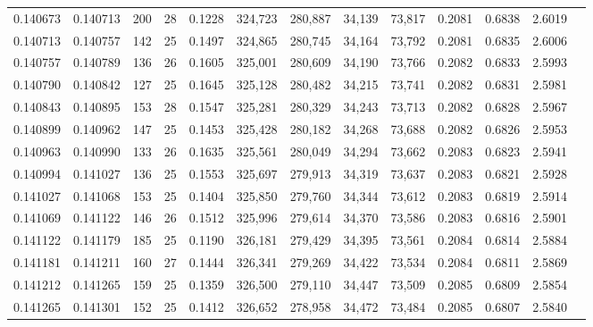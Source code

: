 \begin{tabular}{rrrrrrrrrrrrr}
0.140673 & 0.140713 & 200 &  28 &                                     0.1228 & 324,723 & 280,887 &  34,139 &  73,817 & 0.2081 & 0.6838 & 2.6019 \\
0.140713 & 0.140757 & 142 &  25 &                                     0.1497 & 324,865 & 280,745 &  34,164 &  73,792 & 0.2081 & 0.6835 & 2.6006 \\
0.140757 & 0.140789 & 136 &  26 &                                     0.1605 & 325,001 & 280,609 &  34,190 &  73,766 & 0.2082 & 0.6833 & 2.5993 \\
0.140790 & 0.140842 & 127 &  25 &                                     0.1645 & 325,128 & 280,482 &  34,215 &  73,741 & 0.2082 & 0.6831 & 2.5981 \\
0.140843 & 0.140895 & 153 &  28 &                                     0.1547 & 325,281 & 280,329 &  34,243 &  73,713 & 0.2082 & 0.6828 & 2.5967 \\
0.140899 & 0.140962 & 147 &  25 &                                     0.1453 & 325,428 & 280,182 &  34,268 &  73,688 & 0.2082 & 0.6826 & 2.5953 \\
0.140963 & 0.140990 & 133 &  26 &                                     0.1635 & 325,561 & 280,049 &  34,294 &  73,662 & 0.2083 & 0.6823 & 2.5941 \\
0.140994 & 0.141027 & 136 &  25 &                                     0.1553 & 325,697 & 279,913 &  34,319 &  73,637 & 0.2083 & 0.6821 & 2.5928 \\
0.141027 & 0.141068 & 153 &  25 &                                     0.1404 & 325,850 & 279,760 &  34,344 &  73,612 & 0.2083 & 0.6819 & 2.5914 \\
0.141069 & 0.141122 & 146 &  26 &                                     0.1512 & 325,996 & 279,614 &  34,370 &  73,586 & 0.2083 & 0.6816 & 2.5901 \\
0.141122 & 0.141179 & 185 &  25 &                                     0.1190 & 326,181 & 279,429 &  34,395 &  73,561 & 0.2084 & 0.6814 & 2.5884 \\
0.141181 & 0.141211 & 160 &  27 &                                     0.1444 & 326,341 & 279,269 &  34,422 &  73,534 & 0.2084 & 0.6811 & 2.5869 \\
0.141212 & 0.141265 & 159 &  25 &                                     0.1359 & 326,500 & 279,110 &  34,447 &  73,509 & 0.2085 & 0.6809 & 2.5854 \\
0.141265 & 0.141301 & 152 &  25 &                                     0.1412 & 326,652 & 278,958 &  34,472 &  73,484 & 0.2085 & 0.6807 & 2.5840 \\

\end{tabular}
